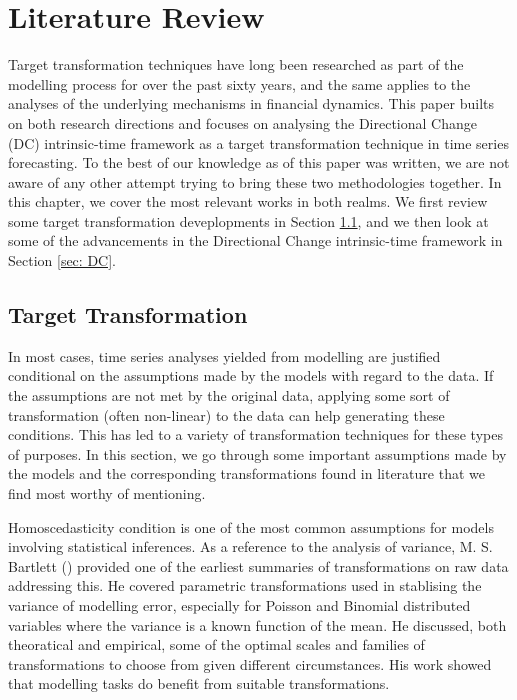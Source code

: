 \chapter{Literature Review}

Target transformation techniques have long been researched as part of the modelling process for over the past sixty years, and the same applies to the analyses of the underlying mechanisms in financial dynamics. This paper builts on both research directions and focuses on analysing the Directional Change (DC) intrinsic-time framework as a target transformation technique in time series forecasting. To the best of our knowledge as of this paper was written, we are not aware of any other attempt trying to bring these two methodologies together. In this chapter, we cover the most relevant works in both realms. We first review some target transformation deveplopments in Section \ref{sec: target transformation}, and we then look at some of the advancements in the Directional Change intrinsic-time framework in Section \ref{sec: DC}.

\section{Target Transformation}\label{sec: target transformation}

In most cases, time series analyses yielded from modelling are justified conditional on the assumptions made by the models with regard to the data. If the assumptions are not met by the original data, applying some sort of transformation (often non-linear) to the data can help generating these conditions. This has led to a variety of transformation techniques for these types of purposes. In this section, we go through some important assumptions made by the models and the corresponding transformations found in literature that we find most worthy of mentioning.

Homoscedasticity condition\footnotemark{} is one of the most common assumptions for models involving statistical inferences. As a reference to the analysis of variance, M. S. Bartlett (\citeyear{10.2307/3001536}) provided one of the earliest summaries of transformations on raw data addressing this. He covered parametric transformations used in stablising the variance of modelling error, especially for Poisson and Binomial distributed variables where the variance is a known function of the mean. He discussed, both theoratical and empirical, some of the optimal scales and families of transformations to choose from given different circumstances. His work showed that modelling tasks do benefit from suitable transformations.

